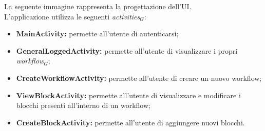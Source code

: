 \newpage
La seguente immagine rappresenta la progettazione dell'UI. \\
L'applicazione utilizza le seguenti \textit{activities$_{G}$}:
\begin{itemize}
	\item \textbf{MainActivity:} permette all'utente di autenticarsi;  
	\item \textbf{GeneralLoggedActivity:} permette all'utente di visualizzare i propri \textit{workflow$_{G}$}; 
	\item \textbf{CreateWorkflowActivity:} permette all'utente di creare un nuovo workflow; 
	\item \textbf{ViewBlockActivity:} permette all'utente di visualizzare e modificare i blocchi presenti all'interno di un workflow;
	\item \textbf{CreateBlockActivity:} permette all'utente di aggiungere nuovi blocchi.

\end{itemize}

